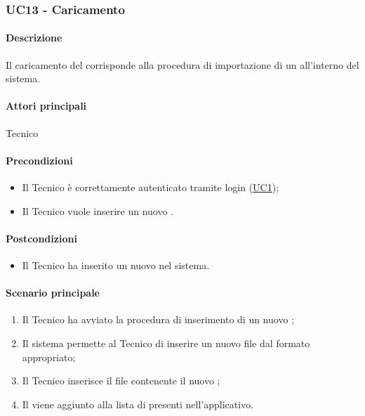 \subsubsection{UC13 - Caricamento }\label{UC13}
\paragraph*{Descrizione}
Il caricamento del  corrisponde alla procedura di importazione di un  all’interno del sistema.

\paragraph*{Attori principali}
Tecnico

\paragraph*{Precondizioni}
\begin{itemize}
  \item Il Tecnico è correttamente autenticato tramite login (\hyperref[UC1]{UC1});
  \item Il Tecnico vuole inserire un nuovo .  
\end{itemize}

\paragraph*{Postcondizioni}
\begin{itemize}
  \item Il Tecnico ha inserito un nuovo  nel sistema.
\end{itemize}

\paragraph*{Scenario principale}
\begin{enumerate}
  \item Il Tecnico ha avviato la procedura di inserimento di un nuovo ;
  \item Il sistema permette al Tecnico di inserire un nuovo file dal formato appropriato;
  \item Il Tecnico inserisce il file contenente il nuovo ;
  \item Il  viene aggiunto alla lista di  presenti nell’applicativo.  
\end{enumerate}

